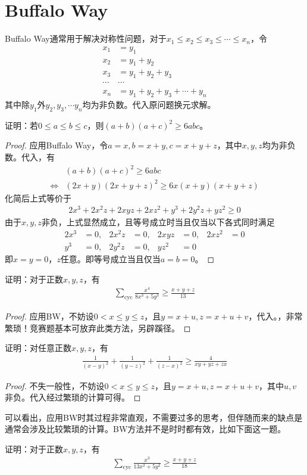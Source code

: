 
\chapter{Buffalo Way}
\label{chap:buffalo-way}

Buffalo Way通常用于解决对称性问题，对于$x_1\le x_2\le x_3\le \cdots\le x_n$，令
\begin{align*}
  x_1&=y_1\\
  x_2&=y_1+y_2\\
  x_3&=y_1+y_2+y_3\\
  \cdots&\cdots\\
  x_n&=y_1+y_2+y_3+\cdots+y_n
\end{align*}
其中除$y_1$外$y_2,y_3,\cdots y_n$均为非负数。代入原问题换元求解。

\begin{example}
  证明：若$0\le a\le b\le c$，则$(a+b)(a+c)^2\ge 6abc$。
\end{example}
\begin{proof}
  应用Buffalo Way，令$a=x, b=x+y, c=x+y+z$，其中$x,y,z$均为非负数。代入，有
  \begin{align*}
    &(a+b)(a+c)^2\ge 6abc\\
    \iff& (2x+y)(2x+y+z)^2\ge 6x(x+y)(x+y+z)
  \end{align*}
  化简后上式等价于
  \begin{align*}
    2x^3+2x^2z+2xyz+2xz^2+y^3+2y^2z+yz^2\ge 0
  \end{align*}
  由于$x,y,z$非负，上式显然成立，且等号成立时当且仅当以下各式同时满足
  \begin{align*}
    2x^3&=0,    &2x^2z&=0,  &2xyz&=0,  &2xz^2&=0\\
    y^3&=0,     &2y^2z&=0,  &yz^2&=0   &     &
  \end{align*}
  即$x=y=0$，$z$任意。即等号成立当且仅当$a=b=0$。
\end{proof}

\begin{example}
  证明：对于正数$x,y,z$，有
  \begin{align*}
    \sum_{\mathrm{cyc}} \frac{x^4}{8x^3+5y^3}\ge\frac{x+y+z}{13}
  \end{align*}
\end{example}
\begin{proof}
  应用BW，不妨设$0<x\le y\le z$，且$y=x+u, z=x+u+v$，代入。\color{red}，非常繁琐！竞赛题基本可放弃此类方法，另辟蹊径。
\end{proof}

\begin{example}
  证明：对任意正数$x,y,z$，有
  \begin{align*}
    \frac1{(x-y)^2}+\frac1{(y-z)^2}+\frac1{(z-x)^2}\ge\frac4{xy+yz+zx}
  \end{align*}
\end{example}
\begin{proof}
  不失一般性，不妨设$0<x\le y\le z$，且$y=x+u,z=x+u+v$，其中$u,v$非负。代入经过繁琐的计算可得。
\end{proof}


可以看出，应用BW时其过程非常直观，不需要过多的思考，但伴随而来的缺点是通常会涉及比较繁琐的计算。BW方法并不是时时都有效，比如下面这一题。
\begin{example}
  证明：对于正数$x,y,z$，有
  \begin{align*}
    \sum_{\mathrm{cyc}} \frac{x^3}{13x^2+5y^2}\ge\frac{x+y+z}{18}
  \end{align*}
\end{example}
